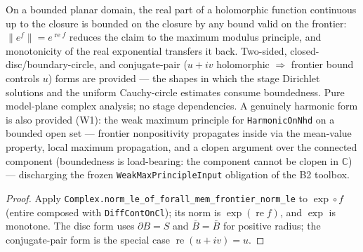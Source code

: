 \begin{lemma}
\label{lem:stage-harmonic-max-principle}
On a bounded planar domain, the real part of a holomorphic function
continuous up to the closure is bounded on the closure by any bound valid
on the frontier: \(\lVert e^{f}\rVert = e^{\operatorname{re} f}\) reduces
the claim to the maximum modulus principle, and monotonicity of the real
exponential transfers it back.  Two-sided, closed-disc/boundary-circle,
and conjugate-pair (\(u + iv\) holomorphic \(\Rightarrow\) frontier bound
controls \(u\)) forms are provided — the shapes in which the stage
Dirichlet solutions and the uniform Cauchy-circle estimates consume
boundedness.  Pure model-plane complex analysis; no stage dependencies.
A genuinely harmonic form is also provided (W1): the weak maximum
principle for \texttt{HarmonicOnNhd} on a bounded open set — frontier
nonpositivity propagates inside via the mean-value property, local
maximum propagation, and a clopen argument over the connected component
(boundedness is load-bearing: the component cannot be clopen in
\(\mathbb{C}\)) — discharging the frozen
\texttt{WeakMaxPrincipleInput} obligation of the B2 toolbox.
\leanok
\end{lemma}
\begin{proof}\leanok
Apply \texttt{Complex.norm\_le\_of\_forall\_mem\_frontier\_norm\_le} to
\(\exp \circ f\) (entire composed with \texttt{DiffContOnCl}); its norm is
\(\exp(\operatorname{re} f)\), and \(\exp\) is monotone.  The disc form
uses \(\partial B = S\) and \(\overline{B} = \bar{B}\) for positive
radius; the conjugate-pair form is the special case
\(\operatorname{re}(u + iv) = u\).
\end{proof}

